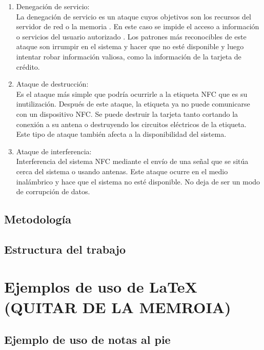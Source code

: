 \documentclass[12pt,a4paper,onecolumn,oneside]{report}
\begin{document}
\begin{enumerate}
\begin{enumerate}
\item Denegación de servicio:\\
La denegación de servicio es un ataque cuyos objetivos son los recursos del servidor de red o la memoria \cite{siete}. En este caso se impide el acceso a información o servicios del usuario autorizado \cite{ocho}. Los patrones más reconocibles de este ataque son irrumpir en el sistema y hacer que no esté disponible y luego intentar robar información valiosa, como la información de la tarjeta de crédito.

\item Ataque de destrucción:\\
Es el ataque más simple que podría ocurrirle a la etiqueta NFC que es su inutilización. Después de este ataque, la etiqueta ya no puede comunicarse con un dispositivo NFC. Se puede destruir la tarjeta tanto cortando la conexión a su antena o destruyendo los circuitos eléctricos de la etiqueta. Este tipo de ataque también afecta a la disponibilidad del sistema.

\item Ataque de interferencia:\\
Interferencia del sistema NFC mediante el envío de una señal que se sitúa cerca del sistema o usando antenas. Este ataque ocurre en el medio inalámbrico y hace que el sistema no esté disponible. No deja de ser un modo de corrupción de datos.

\end{enumerate}

\end{enumerate}


\section*{Metodología}



\section*{Estructura del trabajo}



\chapter*{Ejemplos de uso de LaTeX (QUITAR DE LA MEMROIA)}
\label{Ejemplos de uso de LaTeX}

\section*{Ejemplo de uso de notas al pie}
\label{Seguridad general}
\end{document}
